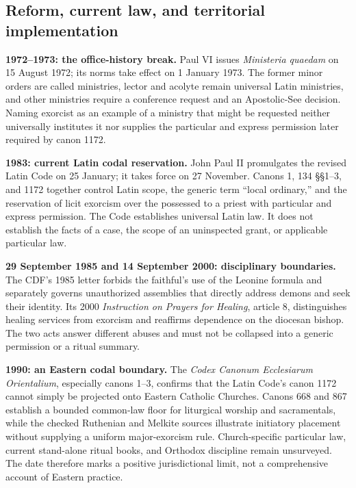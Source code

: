 \subsection{Reform, current law, and territorial implementation}

\noindent\textbf{1972--1973: the office-history break.}
Paul VI issues \emph{Ministeria quaedam} on 15 August 1972; its norms take
effect on 1 January 1973. The former minor orders are called ministries,
lector and acolyte remain universal Latin ministries, and other ministries
require a conference request and an Apostolic-See decision. Naming exorcist
as an example of a ministry that might be requested neither universally
institutes it nor supplies the particular and express permission later
required by canon 1172.

\medskip\noindent\textbf{1983: current Latin codal reservation.}
John Paul II promulgates the revised Latin Code on 25 January; it takes force
on 27 November. Canons 1, 134 \S\S1--3, and 1172 together control Latin
scope, the generic term ``local ordinary,'' and the reservation of licit
exorcism over the possessed to a priest with particular and express
permission. The Code establishes universal Latin law. It does not establish
the facts of a case, the scope of an uninspected grant, or applicable
particular law.

\medskip\noindent\textbf{29 September 1985 and 14 September 2000:
disciplinary boundaries.}
The CDF's 1985 letter forbids the faithful's use of the Leonine formula and
separately governs unauthorized assemblies that directly address demons and
seek their identity. Its 2000
\emph{Instruction on Prayers for Healing}, article 8, distinguishes healing
services from exorcism and reaffirms dependence on the diocesan bishop. The
two acts answer different abuses and must not be collapsed into a generic
permission or a ritual summary.

\medskip\noindent\textbf{1990: an Eastern codal boundary.}
The \emph{Codex Canonum Ecclesiarum Orientalium}, especially canons 1--3,
confirms that the Latin Code's canon 1172 cannot simply be projected onto
Eastern Catholic Churches. Canons 668 and 867 establish a bounded common-law
floor for liturgical worship and sacramentals, while the checked Ruthenian and
Melkite sources illustrate initiatory placement without supplying a uniform
major-exorcism rule. Church-specific particular law, current stand-alone
ritual books, and Orthodox discipline remain unsurveyed. The date therefore
marks a positive jurisdictional limit, not a comprehensive account of Eastern
practice.

